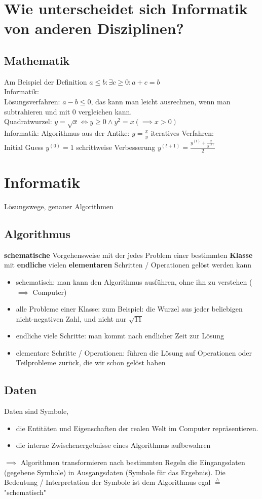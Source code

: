 \documentclass[a4paper]{scrartcl}
\newcommand{\estimates}{\overset{\scriptscriptstyle\wedge}{=}}%
\theoremstyle{definition}
\theoremstyle{plain}
\theoremstyle{remark}
\theoremstyle{remark}
\begin{document}
\section{Wie unterscheidet sich Informatik von anderen Disziplinen?}
\label{sec-2}
\subsection{Mathematik}
\label{sec-2-1}
Am Beispiel der Definition $a \leq b: \exists c \geq 0: a + c = b$ \\
   Informatik: \\
   Lösungsverfahren: $a - b \leq 0$, das kann man leicht ausrechnen, wenn man subtrahieren und mit $0$ vergleichen kann. \\
   Quadratwurzel: $y = \sqrt{x} \iff y \geq 0 \wedge y^2 = x (\implies x > 0)$ \\
   Informatik: Algorithmus aus der Antike: $y = \frac{x}{y}$
iteratives Verfahren: \\
   Initial Guess $y^{(0)} = 1$
schrittweise Verbesserung $y^{(t+1)} = \frac{y^{(t)} + \frac{x}{y^{(t)}}}{2}$
\section{Informatik}
\label{sec-3}
Lösungswege, genauer Algorithmen
\subsection{Algorithmus}
\label{sec-3-1}
\textbf{schematische} Vorgehensweise mit der jedes Problem einer bestimmten \textbf{Klasse} mit \textbf{endliche} vielen \textbf{elementaren} Schritten / Operationen gelöst werden kann
\begin{itemize}
\item schematisch: man kann den Algorithmus ausführen, ohne ihn zu verstehen ($\implies$ Computer)
\item alle Probleme einer Klasse: zum Beispiel: die Wurzel aus jeder beliebigen nicht-negativen Zahl, und nicht nur $\sqrt{11}$
\item endliche viele Schritte: man kommt nach endlicher Zeit zur Lösung
\item elementare Schritte / Operationen: führen die Lösung auf Operationen oder Teilprobleme zurück, die wir schon gelöst haben
\end{itemize}
\subsection{Daten}
\label{sec-3-2}
Daten sind Symbole,
\begin{itemize}
\item die Entitäten und Eigenschaften der realen Welt im Computer repräsentieren.
\item die interne Zwischenergebnisse eines Algorithmus aufbewahren
\end{itemize}
$\implies$ Algorithmen transformieren nach bestimmten Regeln die Eingangsdaten (gegebene Symbole) in Ausgangsdaten (Symbole für das Ergebnis).
Die Bedeutung / Interpretation der Symbole ist dem Algorithmus egal $\estimates$ "schematisch"
\end{document}
